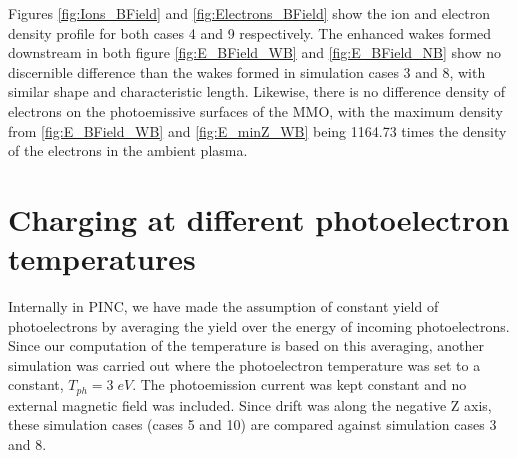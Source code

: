 Figures \ref{fig:Ions_BField} and \ref{fig:Electrons_BField} show the ion and electron density profile for both cases 4 and 9 respectively. The enhanced wakes formed downstream in both figure \ref{fig:E_BField_WB} and \ref{fig:E_BField_NB} show no discernible difference than the wakes formed in simulation cases 3 and 8, with similar shape and characteristic length. Likewise, there is no difference density of electrons on the photoemissive surfaces of the MMO, with the maximum density from \ref{fig:E_BField_WB} and \ref{fig:E_minZ_WB} being 1164.73 times the density of the electrons in the ambient plasma. 


\section{Charging at different photoelectron temperatures}
Internally in PINC, we have made the assumption of constant yield of photoelectrons by averaging the yield over the energy of incoming photoelectrons. Since our computation of the temperature is based on this averaging, another simulation was carried out where the photoelectron temperature was set to a constant, $T_{ph} = 3 \; eV$. The photoemission current was kept constant and no external magnetic field was included. Since drift was along the negative Z axis, these simulation cases (cases 5 and 10) are compared against simulation cases 3 and 8.  


